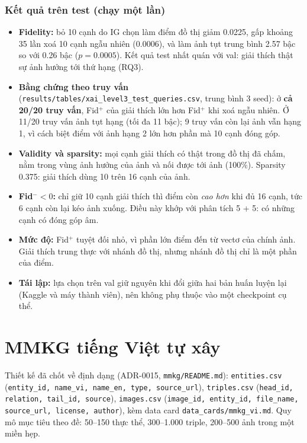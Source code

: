 \documentclass[12pt, a4paper]{article}
\newcommand{\code}[1]{\texttt{#1}}
\begin{document}
\subsubsection{Kết quả trên test (chạy một lần)}
\begin{itemize}
\item \textbf{Fidelity:} bỏ 10 cạnh do IG chọn làm điểm đồ thị giảm 0.0225, gấp khoảng 35 lần xoá 10 cạnh ngẫu nhiên (0.0006), và làm ảnh tụt trung bình 2.57 bậc so với 0.26 bậc ($p=0.0005$). Kết quả test nhất quán với val: giải thích thật sự ảnh hưởng tới thứ hạng (RQ3).
\item \textbf{Bằng chứng theo truy vấn} (\code{results/tables/xai\_level3\_test\_queries.csv}, trung bình 3 seed): ở \textbf{cả 20/20 truy vấn}, Fid$^+$ của giải thích lớn hơn Fid$^+$ khi xoá ngẫu nhiên. Ở 11/20 truy vấn ảnh tụt hạng (tối đa 11 bậc); 9 truy vấn còn lại ảnh vẫn hạng 1, vì cách biệt điểm với ảnh hạng 2 lớn hơn phần mà 10 cạnh đóng góp.
\item \textbf{Validity và sparsity:} mọi cạnh giải thích có thật trong đồ thị đã chấm, nằm trong vùng ảnh hưởng của ảnh và nối được tới ảnh (100\%). Sparsity 0.375: giải thích dùng 10 trên 16 cạnh của ảnh.
\item \textbf{Fid$^-<0$:} chỉ giữ 10 cạnh giải thích thì điểm còn \emph{cao hơn} khi đủ 16 cạnh, tức 6 cạnh còn lại kéo ảnh xuống. Điều này khớp với phân tích 5 + 5: có những cạnh có đóng góp âm.
\item \textbf{Mức độ:} Fid$^+$ tuyệt đối nhỏ, vì phần lớn điểm đến từ vectơ của chính ảnh. Giải thích trung thực với nhánh đồ thị, nhưng nhánh đồ thị chỉ là một phần của điểm.
\item \textbf{Tái lập:} lựa chọn trên val giữ nguyên khi đổi giữa hai bản huấn luyện lại (Kaggle và máy thành viên), nên không phụ thuộc vào một checkpoint cụ thể.
\end{itemize}

\section{MMKG tiếng Việt tự xây}
\label{sec:mmkg}
Thiết kế đã chốt về định dạng (ADR-0015, \code{mmkg/README.md}): \code{entities.csv} (\code{entity\_id, name\_vi, name\_en, type, source\_url}), \code{triples.csv} (\code{head\_id, relation, tail\_id, source}), \code{images.csv} (\code{image\_id, entity\_id, file\_name, source\_url, license, author}), kèm data card \code{data\_cards/mmkg\_vi.md}. Quy mô mục tiêu theo đề: 50--150 thực thể, 300--1.000 triple, 200--500 ảnh trong một miền hẹp.
\end{document}
